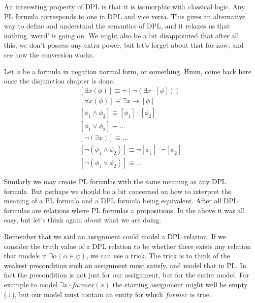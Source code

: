 \documentclass[12pt]{article}
\begin{document}
An interesting property of DPL is that it is isomorphic with classical logic. Any PL formula corresponds to one in DPL and vice versa. This gives an alternative way to define and understand the semantics of DPL, and it relaxes us that nothing `weird' is going on. We might also be a bit disappointed that after all this, we don't possess any extra power, but let's forget about that for now, and see how the conversion works.

Let $\phi$ be a formula in negation normal form, or something. Hmm, come back here once the disjunction chapter is done.
\begin{align}
&[\exists x(\phi)] \equiv \neg(\neg(\exists x \cdot [\phi]))\\
&[\forall x(\phi)] \equiv \exists x \rightarrow [\phi]\\
&[\phi_1\wedge\phi_2] \equiv [\phi_1]\cdot[\phi_2]\\
&[\phi_1\vee\phi_2] \equiv \dots\\
&[\neg(\exists x)] \equiv \dots\\
&[\neg(\phi_1\wedge\phi_2)] \equiv \neg[\phi_1]\cdot\neg[\phi_2]\\
&[\neg(\phi_1\vee\phi_2)] \equiv \dots
\end{align}

Similarly we may create PL formulas with the same meaning as any DPL formula. But perhaps we should be a bit concerned on how to interpret the meaning of a PL formula and a DPL formula being equivalent. After all DPL formulas are relations where PL formulas a propositions. In the above it was all easy, but let's think again about what we are doing.

Remember that we said an assignment could model a DPL relation. If we consider the truth value of a DPL relation to be whether there exists any relation that models it $\exists\alpha(\alpha\models\psi)$, we can use a trick. The trick is to think of the weakest precondition such an assignment must satisfy, and model that in PL. In fact the precondition is not just for our assignment, but for the entire model. For example to model $\exists x\cdot farmer(x)$ the starting assignment might well be empty ($\bot$), but our model must contain an entity for which $farmer$ is true.
\end{document}
